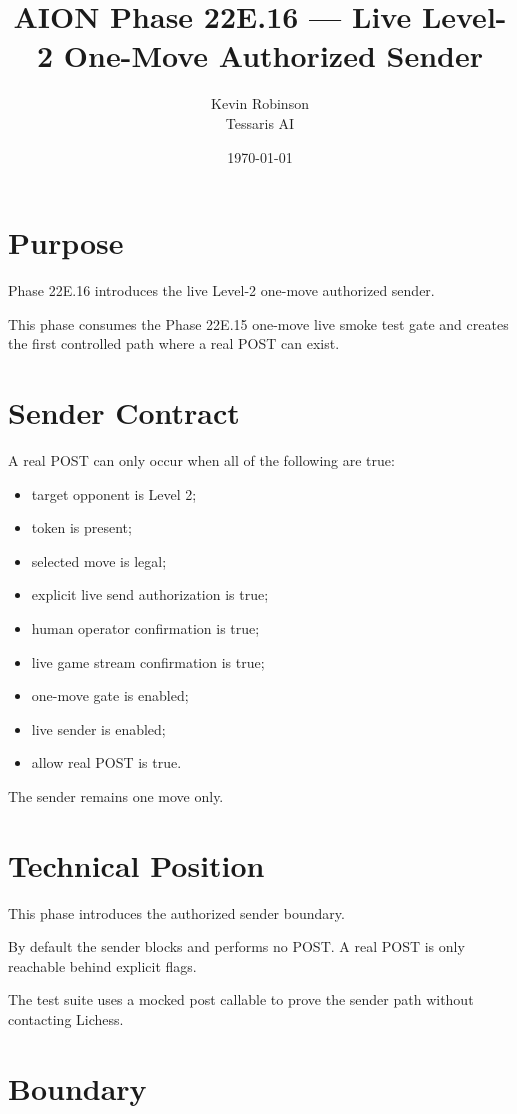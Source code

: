 \documentclass[11pt,a4paper]{article}
\title{\textbf{AION Phase 22E.16 --- Live Level-2 One-Move Authorized Sender}}
\author{Kevin Robinson\\Tessaris AI}
\date{\today}
\begin{document}
\maketitle

\section{Purpose}

Phase 22E.16 introduces the live Level-2 one-move authorized sender.

This phase consumes the Phase 22E.15 one-move live smoke test gate and creates the first controlled path where a real POST can exist.

\section{Sender Contract}

A real POST can only occur when all of the following are true:

\begin{itemize}[leftmargin=*]
  \item target opponent is Level 2;
  \item token is present;
  \item selected move is legal;
  \item explicit live send authorization is true;
  \item human operator confirmation is true;
  \item live game stream confirmation is true;
  \item one-move gate is enabled;
  \item live sender is enabled;
  \item allow real POST is true.
\end{itemize}

The sender remains one move only.

\section{Technical Position}

This phase introduces the authorized sender boundary.

By default the sender blocks and performs no POST. A real POST is only reachable behind explicit flags.

The test suite uses a mocked post callable to prove the sender path without contacting Lichess.

\section{Boundary}
\end{document}
